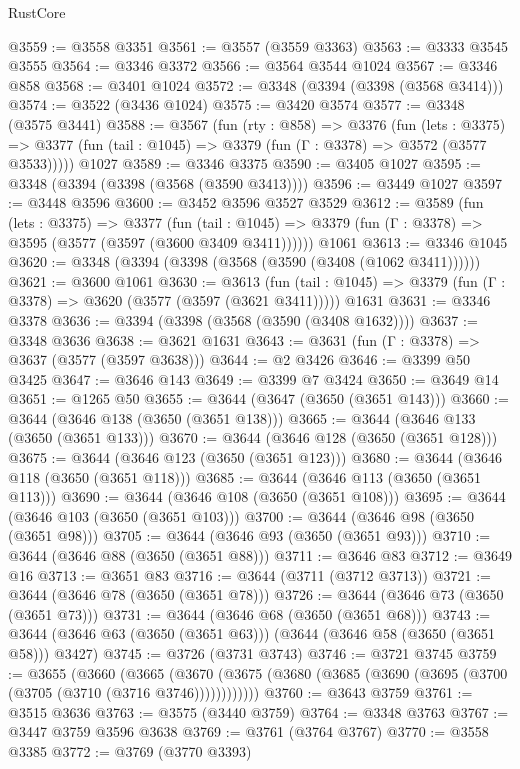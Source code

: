 \begin{lexlean}{RustCore}
\begin{coremodule}
@3559 := @3558 @3351
@3561 := @3557 (@3559 @3363)
@3563 := @3333 @3545 @3555
@3564 := @3346 @3372
@3566 := @3564 @3544 @1024
@3567 := @3346 @858
@3568 := @3401 @1024
@3572 := @3348 (@3394 (@3398 (@3568 @3414)))
@3574 := @3522 (@3436 @1024)
@3575 := @3420 @3574
@3577 := @3348 (@3575 @3441)
@3588 := @3567
    (fun (rty : @858) =>
    @3376
      (fun (lets : @3375) =>
      @3377 (fun (tail : @1045) => @3379 (fun (Γ : @3378) => @3572 (@3577 @3533)))))
    @1027
@3589 := @3346 @3375
@3590 := @3405 @1027
@3595 := @3348 (@3394 (@3398 (@3568 (@3590 @3413))))
@3596 := @3449 @1027
@3597 := @3448 @3596
@3600 := @3452 @3596 @3527 @3529
@3612 := @3589
    (fun (lets : @3375) =>
    @3377
      (fun (tail : @1045) => @3379 (fun (Γ : @3378) => @3595 (@3577 (@3597 (@3600 @3409 @3411))))))
    @1061
@3613 := @3346 @1045
@3620 := @3348 (@3394 (@3398 (@3568 (@3590 (@3408 (@1062 @3411))))))
@3621 := @3600 @1061
@3630 := @3613
    (fun (tail : @1045) => @3379 (fun (Γ : @3378) => @3620 (@3577 (@3597 (@3621 @3411)))))
    @1631
@3631 := @3346 @3378
@3636 := @3394 (@3398 (@3568 (@3590 (@3408 @1632))))
@3637 := @3348 @3636
@3638 := @3621 @1631
@3643 := @3631 (fun (Γ : @3378) => @3637 (@3577 (@3597 @3638)))
@3644 := @2 @3426
@3646 := @3399 @50 @3425
@3647 := @3646 @143
@3649 := @3399 @7 @3424
@3650 := @3649 @14
@3651 := @1265 @50
@3655 := @3644 (@3647 (@3650 (@3651 @143)))
@3660 := @3644 (@3646 @138 (@3650 (@3651 @138)))
@3665 := @3644 (@3646 @133 (@3650 (@3651 @133)))
@3670 := @3644 (@3646 @128 (@3650 (@3651 @128)))
@3675 := @3644 (@3646 @123 (@3650 (@3651 @123)))
@3680 := @3644 (@3646 @118 (@3650 (@3651 @118)))
@3685 := @3644 (@3646 @113 (@3650 (@3651 @113)))
@3690 := @3644 (@3646 @108 (@3650 (@3651 @108)))
@3695 := @3644 (@3646 @103 (@3650 (@3651 @103)))
@3700 := @3644 (@3646 @98 (@3650 (@3651 @98)))
@3705 := @3644 (@3646 @93 (@3650 (@3651 @93)))
@3710 := @3644 (@3646 @88 (@3650 (@3651 @88)))
@3711 := @3646 @83
@3712 := @3649 @16
@3713 := @3651 @83
@3716 := @3644 (@3711 (@3712 @3713))
@3721 := @3644 (@3646 @78 (@3650 (@3651 @78)))
@3726 := @3644 (@3646 @73 (@3650 (@3651 @73)))
@3731 := @3644 (@3646 @68 (@3650 (@3651 @68)))
@3743 := @3644 (@3646 @63 (@3650 (@3651 @63))) (@3644 (@3646 @58 (@3650 (@3651 @58))) @3427)
@3745 := @3726 (@3731 @3743)
@3746 := @3721 @3745
@3759 := @3655
    (@3660
      (@3665 (@3670 (@3675 (@3680 (@3685 (@3690 (@3695 (@3700 (@3705 (@3710 (@3716 @3746))))))))))))
@3760 := @3643 @3759
@3761 := @3515 @3636
@3763 := @3575 (@3440 @3759)
@3764 := @3348 @3763
@3767 := @3447 @3759 @3596 @3638
@3769 := @3761 (@3764 @3767)
@3770 := @3558 @3385
@3772 := @3769 (@3770 @3393)

\end{coremodule}
\end{lexlean}
